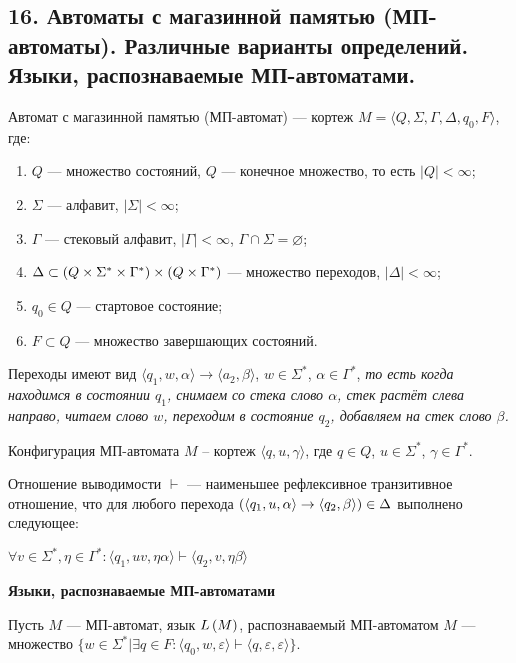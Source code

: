 \subsection{16. Автоматы с магазинной памятью (МП-автоматы). Различные варианты определений. Языки, распознаваемые МП-автоматами.}
\Def Автомат с магазинной памятью (МП-автомат) — кортеж $M = \langle Q, \Sigma, \Gamma, \Delta, q_0, F \rangle$, где:

\begin{enumerate}
    \item $Q$ — множество состояний, $Q$ — конечное множество, то есть $|Q| < \infty$;
    \item $\Sigma$ — алфавит, $|\Sigma| < \infty$;
    \item $\Gamma$ — стековый алфавит, $|\Gamma| < \infty$, $\Gamma \cap \Sigma = \varnothing$;
    \item $\Delta \subset \left({Q \times \Sigma^* \times \Gamma^*}\right) \times \left({Q \times \Gamma^*}\right)$ — множество переходов, $|\Delta| < \infty$;
    \item $q_0 \in Q$ — стартовое состояние;
    \item $F \subset Q$ — множество завершающих состояний.
\end{enumerate}

Переходы имеют вид $\langle q_1, w, \alpha \rangle \rightarrow \langle a_2, \beta \rangle$, $w \in \Sigma^*$, $\alpha \in \Gamma^*$, \textit{то есть когда находимся в состоянии $q_1$, снимаем со стека слово $\alpha$, стек растёт слева направо, читаем слово $w$, переходим в состояние $q_2$, добавляем на стек слово $\beta$.}

\Def Конфигурация МП-автомата $M$ -- кортеж $\langle q, u, \gamma \rangle$, где $q \in Q$, $u \in \Sigma^*$, $\gamma \in \Gamma^*$.

\Def Отношение выводимости $\vdash$ — наименьшее рефлексивное транзитивное отношение, что для любого перехода $\left({\langle q_1, u, \alpha \rangle \rightarrow \langle q_2, \beta \rangle}\right) \in \Delta$ выполнено следующее:

\begin{center}
    $\forall v \in \Sigma^*, \eta \in \Gamma^* : \langle q_1, uv, \eta \alpha \rangle \vdash \langle q_2, v, \eta \beta \rangle$
\end{center}

\textbf{Языки, распознаваемые МП-автоматами}

\Def Пусть $M$ — МП-автомат, язык $L \left({M}\right)$, распознаваемый МП-автоматом $M$ — множество $\{ w \in \Sigma^* | \exists q \in F : \langle q_0, w, \varepsilon \rangle \vdash \langle q, \varepsilon, \varepsilon \rangle \}$.

